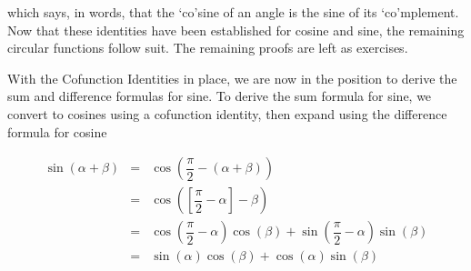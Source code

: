 which says, in words, that the `co'sine of an angle is the sine of its `co'mplement.  Now that these identities have been established for cosine and sine, the remaining circular functions follow suit.  The remaining proofs are left as exercises.

\medskip


\medskip

With the Cofunction Identities in place, we are now in the position to derive the sum and difference formulas for sine.  To derive the sum formula for sine, we convert to cosines using a cofunction identity, then expand using the difference formula for cosine

\[ \begin{array}{rcl}

\sin(\alpha + \beta) & = & \cos\left( \dfrac{\pi}{2} - (\alpha + \beta) \right) \\ [10pt]
                     & = & \cos\left( \left[\dfrac{\pi}{2} - \alpha \right] - \beta \right) \\ [10pt]
                     & = & \cos\left(\dfrac{\pi}{2} - \alpha \right) \cos(\beta) + \sin\left(\dfrac{\pi}{2} - \alpha \right)\sin(\beta) \\ [10pt]
                     & = & \sin(\alpha) \cos(\beta) + \cos(\alpha) \sin(\beta) \\ \end{array} \]


